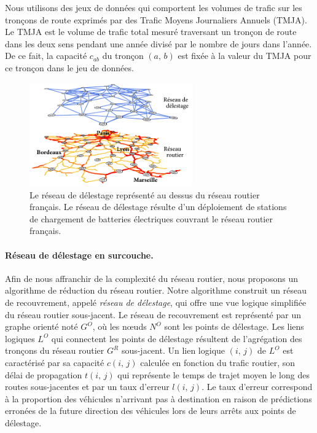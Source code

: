  
Nous utilisons des jeux de données qui comportent les volumes de trafic sur les tronçons de route exprimés par des Trafic Moyens Journaliers Annuels (TMJA). Le TMJA est le volume de trafic total mesuré traversant un tronçon de route dans les deux sens pendant une année divisé par le nombre de jours dans l’année. De ce fait, la capacité $c_{ab}$ du tronçon $(a,\,b)$ est fixée à la valeur du TMJA pour ce tronçon dans le jeu de données. 
 
\begin{figure}
    \includegraphics[width=7cm]{figures-fr/France-overlay-fr.pdf}
    \caption{Le réseau de délestage représenté au dessus du réseau routier français. Le réseau de délestage résulte d’un déploiement de stations de chargement de batteries électriques couvrant le réseau routier français.}
    \label{fig:France-overlay-fr}
\end{figure}
\paragraph{Réseau de délestage en surcouche.} 
Afin de nous affranchir de la complexité du réseau routier, nous proposons un algorithme de réduction du réseau routier. Notre algorithme construit un réseau de recouvrement, appelé \textit{réseau de délestage}, qui offre une vue logique simplifiée du réseau routier sous-jacent. Le réseau de recouvrement est représenté par un graphe orienté noté $G^{O}$, où les nœuds $N^{O}$ sont les points de délestage. Les liens logiques $L^{O}$ qui connectent les points de délestage résultent de l’agrégation  des tronçons du réseau routier $G^{R}$ sous-jacent. Un lien logique $(i,\,j)$ de $L^{O}$ est caractérisé par sa capacité $c(i,\,j)$ calculée en fonction du trafic routier, son délai de propagation $t(i,\,j)$ qui représente le temps de trajet moyen le long des routes sous-jacentes et par un taux d’erreur $l(i,\,j)$. Le taux d’erreur correspond à la proportion des véhicules n’arrivant pas à destination en raison de prédictions erronées de la future direction des véhicules lors de leurs arrêts aux points de délestage. 
 
